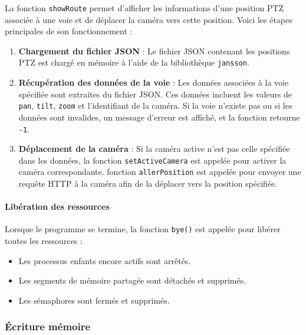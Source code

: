 \documentclass[a4paper, 11pt, french]{article}
\begin{document}
La fonction \texttt{showRoute} permet d'afficher les informations d'une position PTZ associée à une voie et de déplacer la caméra vers cette position. Voici les étapes principales de son fonctionnement :
\begin{enumerate}
    \item \textbf{Chargement du fichier JSON} :
        Le fichier JSON contenant les positions PTZ est chargé en mémoire à l'aide de la bibliothèque \texttt{jansson}. 
        

    \item \textbf{Récupération des données de la voie} :
        Les données associées à la voie spécifiée sont extraites du fichier JSON.
        Ces données incluent les valeurs de \texttt{pan}, \texttt{tilt}, \texttt{zoom} et l'identifiant de la caméra. Si la voie n'existe pas ou si les données sont invalides, un message d'erreur est affiché, et la fonction retourne \texttt{-1}.
    
    \item \textbf{Déplacement de la caméra} :
        Si la caméra active n'est pas celle spécifiée dans les données, la fonction \texttt{setActiveCamera} est appelée pour activer la caméra correspondante.  fonction \texttt{allerPosition} est appelée pour envoyer une requête HTTP à la caméra afin de la déplacer vers la position spécifiée.
    
\end{enumerate}



\paragraph{Libération des ressources}
Lorsque le programme se termine, la fonction \texttt{bye()} est appelée pour libérer toutes les ressources :
\begin{itemize}
    \item Les processus enfants encore actifs sont arrêtés.
    \item Les segments de mémoire partagée sont détachés et supprimés.
    \item Les sémaphores sont fermés et supprimés.
\end{itemize}


\subsubsection{\'Ecriture mémoire}
\end{document}
